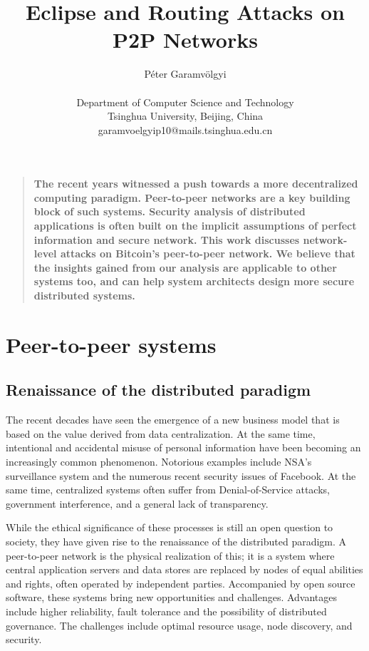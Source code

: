 \documentclass[12pt]{article}
\title{Eclipse and Routing Attacks on P2P Networks}
\author
{Péter Garamvölgyi\\
\\
Department of Computer Science and Technology\\
Tsinghua University, Beijing, China\\
\normalsize{garamvoelgyip10@mails.tsinghua.edu.cn}
}
\date{}
\newenvironment{sciabstract}{%
\begin{quote} \bf}
{\end{quote}}
\begin{document}
 




\maketitle 




\begin{sciabstract}
The recent years witnessed a push towards a more decentralized computing paradigm. Peer-to-peer networks are a key building block of such systems. Security analysis of distributed applications is often built on the implicit assumptions of perfect information and secure network. This work discusses network-level attacks on Bitcoin's peer-to-peer network. We believe that the insights gained from our analysis are applicable to other systems too, and can help system architects design more secure distributed systems.
\end{sciabstract}


\section{Peer-to-peer systems}

\subsection{Renaissance of the distributed paradigm}

The recent decades have seen the emergence of a new business model that is based on the value derived from data centralization. At the same time, intentional and accidental misuse of personal information have been becoming an increasingly common phenomenon. Notorious examples include NSA's surveillance system and the numerous recent security issues of Facebook. At the same time, centralized systems often suffer from Denial-of-Service attacks, government interference, and a general lack of transparency.

While the ethical significance of these processes is still an open question to society, they have given rise to the renaissance of the distributed paradigm. A peer-to-peer network is the physical realization of this; it is a system where central application servers and data stores are replaced by nodes of equal abilities and rights, often operated by independent parties. Accompanied by open source software, these systems bring new opportunities and challenges. Advantages include higher reliability, fault tolerance and the possibility of distributed governance. The challenges include optimal resource usage, node discovery, and security.
\end{document}
